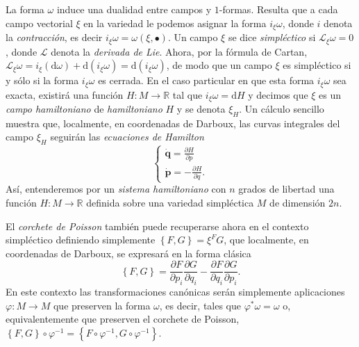 \documentclass[12pt,a4paper,twocolumn,reqno]{amsart}
\theoremstyle{definition} \newtheorem{defn}[thm]{Definición}
\theoremstyle{definition} \newtheorem{ejemplo}[thm]{Ejemplo}
\theoremstyle{definition} \newtheorem{ejercicio}[thm]{Ejercicio}
\theoremstyle{remark} \newtheorem*{obs}{Observación}
\def\RR{\mathbb{R}}
\def\dd{\mathrm{d}}
\def\lie{\mathcal{L}}
\newcommand{\vect}[1]{\mathbf{#1}}
\newcommand{\parcial}[2]{\frac{\partial #1}{\partial #2}}
\begin{document}
La forma $\omega$ induce una dualidad entre campos y $1$-formas. Resulta que a cada campo vectorial $\xi$ en la variedad le podemos asignar la forma $i_{\xi}\omega$, donde $i$ denota la \emph{contracción}, es decir $i_{\xi}\omega=\omega(\xi,\bullet)$. Un campo $\xi$ se dice \emph{simpléctico} si $\lie_{\xi}\omega=0$, donde $\lie$ denota la \emph{derivada de Lie}. Ahora, por la fórmula de Cartan, $\lie_{\xi}\omega=i_{\xi}(\dd \omega)+\dd(i_{\xi}\omega)=\dd(i_{\xi}\omega)$, de modo que un campo $\xi$ es simpléctico si y sólo si la forma $i_{\xi}\omega$ es cerrada. En el caso particular en que esta forma $i_{\xi}\omega$ sea exacta, existirá una función $H:M\rightarrow \RR$ tal que $i_{\xi}\omega=\dd H$ y decimos que $\xi$ es un \emph{campo hamiltoniano} de \emph{hamiltoniano} $H$ y se denota $\xi_H$. Un cálculo sencillo muestra que, localmente, en coordenadas de Darboux, las curvas integrales del campo $\xi_H$ seguirán las \emph{ecuaciones de Hamilton}
\begin{equation}
  \begin{cases}
   \dot{\vect{q}}=\parcial{H}{p}\\ 
    \dot{\vect{p}}=-\parcial{H}{q} .
  \end{cases}
  \label{eq:hamilton}
\end{equation}
Así, entenderemos por un \emph{sistema hamiltoniano} con $n$ grados de libertad una función $H:M\rightarrow \RR$ definida sobre una variedad simpléctica $M$ de dimensión $2n$.

El \emph{corchete de Poisson} también puede recuperarse ahora en el contexto simpléctico definiendo simplemente $\left\{ F,G \right\}=\xi^F G$, que localmente, en coordenadas de Darboux, se expresará en la forma clásica
\begin{equation}
  \left\{ F,G \right\}=\parcial{F}{p_i}\parcial{G}{q_i}-\parcial{F}{q_i}\parcial{G}{p_i}.
  \label{eq:poisson}
\end{equation}
En este contexto las transformaciones canónicas serán simplemente aplicaciones $\varphi:M\rightarrow M$ que preserven la forma $\omega$, es decir, tales que $\varphi^*\omega=\omega$ o, equivalentemente que preserven el corchete de Poisson, $\left\{ F,G \right\}\circ \varphi^{-1}=\left\{ F\circ \varphi^{-1},G\circ \varphi^{-1} \right\}$.
\end{document}
